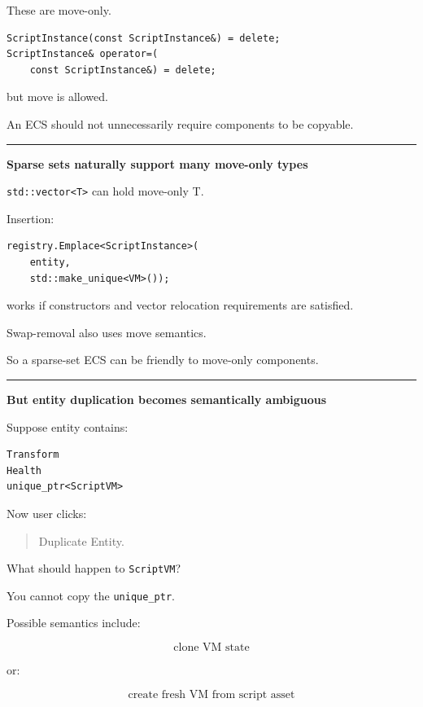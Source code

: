 These are move-only.

\begin{verbatim}
ScriptInstance(const ScriptInstance&) = delete;
ScriptInstance& operator=(
    const ScriptInstance&) = delete;
\end{verbatim}

but move is allowed.

An ECS should not unnecessarily require components to be copyable.

\begin{center}\rule{0.5\linewidth}{0.5pt}\end{center}

\textbf{Sparse sets naturally support many move-only types}

\texttt{std::vector\textless{}T\textgreater{}} can hold move-only T.

Insertion:

\begin{verbatim}
registry.Emplace<ScriptInstance>(
    entity,
    std::make_unique<VM>());
\end{verbatim}

works if constructors and vector relocation requirements are satisfied.

Swap-removal also uses move semantics.

So a sparse-set ECS can be friendly to move-only components.

\begin{center}\rule{0.5\linewidth}{0.5pt}\end{center}

\textbf{But entity duplication becomes semantically ambiguous}

Suppose entity contains:

\begin{verbatim}
Transform
Health
unique_ptr<ScriptVM>
\end{verbatim}

Now user clicks:

\begin{quote}
Duplicate Entity.
\end{quote}

What should happen to \texttt{ScriptVM}?

You cannot copy the \texttt{unique\_ptr}.

Possible semantics include:

\[
\text{clone VM state}
\]

or:

\[
\text{create fresh VM from script asset}
\]

